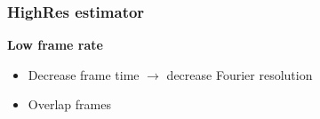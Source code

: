 \documentclass[table]{beamer}
\begin{document}
\begin{frame}[t]
\frametitle{HighRes estimator}
    {\large \textbf{Low frame rate}}
    \begin{itemize}
        \item Decrease frame time $\rightarrow$ decrease Fourier resolution
        \item Overlap frames
    \end{itemize}

\end{frame}
\end{document}

